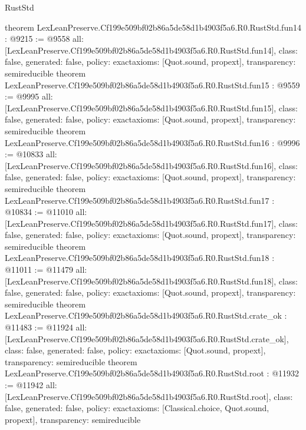 \begin{lexlean}{RustStd}
\begin{coremodule}
{}
theorem LexLeanPreserve.Cf199e509bf02b86a5de58d1b4903f5a6.R0.RustStd.fun14 : @9215 := @9558 {
  all: [LexLeanPreserve.Cf199e509bf02b86a5de58d1b4903f5a6.R0.RustStd.fun14],
  class: false,
  generated: false,
  policy: exact{axioms: [Quot.sound, propext]},
  transparency: semireducible
}
theorem LexLeanPreserve.Cf199e509bf02b86a5de58d1b4903f5a6.R0.RustStd.fun15 : @9559 := @9995 {
  all: [LexLeanPreserve.Cf199e509bf02b86a5de58d1b4903f5a6.R0.RustStd.fun15],
  class: false,
  generated: false,
  policy: exact{axioms: [Quot.sound, propext]},
  transparency: semireducible
}
theorem LexLeanPreserve.Cf199e509bf02b86a5de58d1b4903f5a6.R0.RustStd.fun16 : @9996 := @10833 {
  all: [LexLeanPreserve.Cf199e509bf02b86a5de58d1b4903f5a6.R0.RustStd.fun16],
  class: false,
  generated: false,
  policy: exact{axioms: [Quot.sound, propext]},
  transparency: semireducible
}
theorem LexLeanPreserve.Cf199e509bf02b86a5de58d1b4903f5a6.R0.RustStd.fun17 : @10834 := @11010 {
  all: [LexLeanPreserve.Cf199e509bf02b86a5de58d1b4903f5a6.R0.RustStd.fun17],
  class: false,
  generated: false,
  policy: exact{axioms: [Quot.sound, propext]},
  transparency: semireducible
}
theorem LexLeanPreserve.Cf199e509bf02b86a5de58d1b4903f5a6.R0.RustStd.fun18 : @11011 := @11479 {
  all: [LexLeanPreserve.Cf199e509bf02b86a5de58d1b4903f5a6.R0.RustStd.fun18],
  class: false,
  generated: false,
  policy: exact{axioms: [Quot.sound, propext]},
  transparency: semireducible
}
theorem LexLeanPreserve.Cf199e509bf02b86a5de58d1b4903f5a6.R0.RustStd.crate_ok : @11483 := @11924 {
  all: [LexLeanPreserve.Cf199e509bf02b86a5de58d1b4903f5a6.R0.RustStd.crate_ok],
  class: false,
  generated: false,
  policy: exact{axioms: [Quot.sound, propext]},
  transparency: semireducible
}
theorem LexLeanPreserve.Cf199e509bf02b86a5de58d1b4903f5a6.R0.RustStd.root : @11932 := @11942 {
  all: [LexLeanPreserve.Cf199e509bf02b86a5de58d1b4903f5a6.R0.RustStd.root],
  class: false,
  generated: false,
  policy: exact{axioms: [Classical.choice, Quot.sound, propext]},
  transparency: semireducible
}


\end{coremodule}
\end{lexlean}
